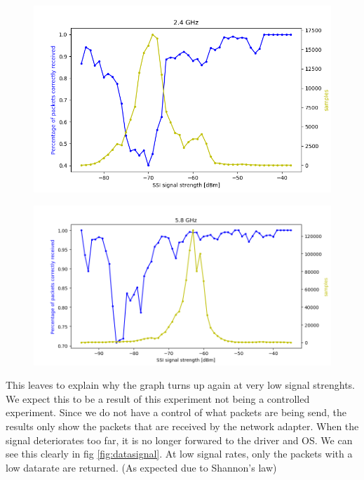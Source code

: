 \documentclass{article}
\begin{document}
\begin{figure}
		\includegraphics[width=\textwidth]{figures/24ghz.png}
		\caption{}
		\label{fig:24packets}
\end{figure}

\begin{figure}
		\includegraphics[width=\textwidth]{figures/58ghz.png}
		\caption{}
		\label{fig:58packets}
\end{figure}

This leaves to explain why the graph turns up again at very low signal strenghts. We expect this to be a result of this experiment not being a controlled experiment. Since we do not have a control of what packets are being send, the results only show the packets that are received by the network adapter. When the signal deteriorates too far, it is no longer forwared to the driver and OS. We can see this clearly in fig \ref{fig:datasignal}. At low signal rates, only the packets with a low datarate are returned. (As expected due to Shannon's law)
\end{document}
